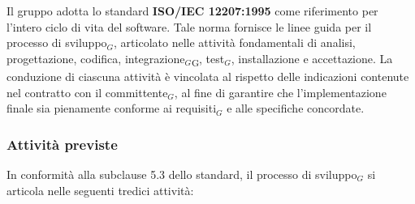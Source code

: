 \documentclass[a4paper, 10pt]{article}
\begin{document}
Il gruppo adotta lo standard \textbf{ISO/IEC 12207:1995} come riferimento per l'intero ciclo di vita del software. Tale norma fornisce le linee guida per il processo di sviluppo$_G$, articolato nelle attività fondamentali di analisi, progettazione, codifica, integrazione$_G$\textsubscript{G}, test$_G$, installazione e accettazione. La conduzione di ciascuna attività è vincolata al rispetto delle indicazioni contenute nel contratto con il committente$_G$, al fine di garantire che l'implementazione finale sia pienamente conforme ai requisiti$_G$ e alle specifiche concordate.
\subsubsection{Attività previste}

In conformità alla subclause 5.3 dello standard, il processo di sviluppo$_G$ si articola nelle seguenti tredici attività:
\end{document}

